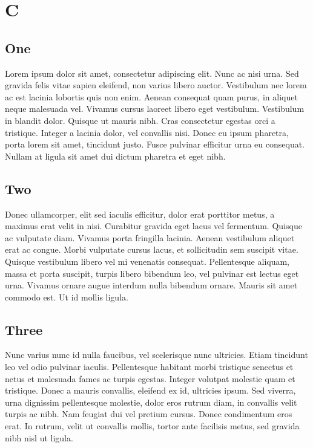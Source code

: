 \chapter{C}

\section{One}
Lorem ipsum dolor sit amet, consectetur adipiscing elit. Nunc ac nisi urna. Sed gravida felis vitae sapien eleifend, non varius libero auctor. Vestibulum nec lorem ac est lacinia lobortis quis non enim. Aenean consequat quam purus, in aliquet neque malesuada vel. Vivamus cursus laoreet libero eget vestibulum. Vestibulum in blandit dolor. Quisque ut mauris nibh. Cras consectetur egestas orci a tristique. Integer a lacinia dolor, vel convallis nisi. Donec eu ipsum pharetra, porta lorem sit amet, tincidunt justo. Fusce pulvinar efficitur urna eu consequat. Nullam at ligula sit amet dui dictum pharetra et eget nibh.

\section{Two}
Donec ullamcorper, elit sed iaculis efficitur, dolor erat porttitor metus, a maximus erat velit in nisi. Curabitur gravida eget lacus vel fermentum. Quisque ac vulputate diam. Vivamus porta fringilla lacinia. Aenean vestibulum aliquet erat ac congue. Morbi vulputate cursus lacus, et sollicitudin sem suscipit vitae. Quisque vestibulum libero vel mi venenatis consequat. Pellentesque aliquam, massa et porta suscipit, turpis libero bibendum leo, vel pulvinar est lectus eget urna. Vivamus ornare augue interdum nulla bibendum ornare. Mauris sit amet commodo est. Ut id mollis ligula.

\section{Three}
Nunc varius nunc id nulla faucibus, vel scelerisque nunc ultricies. Etiam tincidunt leo vel odio pulvinar iaculis. Pellentesque habitant morbi tristique senectus et netus et malesuada fames ac turpis egestas. Integer volutpat molestie quam et tristique. Donec a mauris convallis, eleifend ex id, ultricies ipsum. Sed viverra, urna dignissim pellentesque molestie, dolor eros rutrum diam, in convallis velit turpis ac nibh. Nam feugiat dui vel pretium cursus. Donec condimentum eros erat. In rutrum, velit ut convallis mollis, tortor ante facilisis metus, sed gravida nibh nisl ut ligula.

